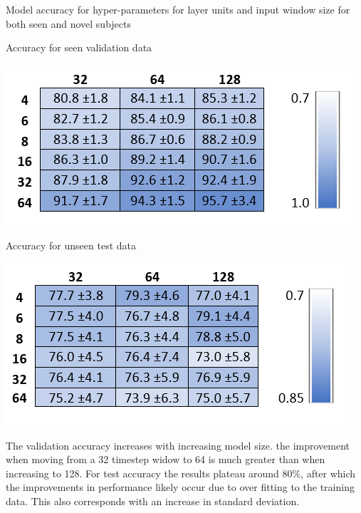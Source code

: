 \documentclass[sensors,article,submit,moreauthors,pdftex]{Definitions/mdpi}
\begin{document}
\begin{table}[!hbt]
    \centering
    \caption{Model accuracy for hyper-parameters for layer units and input window size for both seen and novel subjects}
    \label{tab:model_size_hyper_param}
    \begin{subtable}{.49\linewidth}
        \centering
        \caption{Accuracy for seen validation data}
        \label{tab:model_size_hyper_param_train}
        \includegraphics[width=\textwidth]{Figures/results/LSTM_Train_Accuracy.png}
    \end{subtable}
    \hfil
    \begin{subtable}{.49\linewidth}
        \centering
        \caption{Accuracy for unseen test data}
        \label{tab:model_size_hyper_param_test}
        \includegraphics[width=\textwidth]{Figures/results/LSTM_Test_Accuracy.png}
    \end{subtable}
\end{table}

The validation accuracy increases with increasing model size. the improvement when moving from a 32 timestep widow to 64 is much greater than when increasing to 128. For test accuracy the results plateau around 80\%, after which the improvements in performance likely occur due to over fitting to the training data. This also corresponds with an increase in standard deviation.
\end{document}
